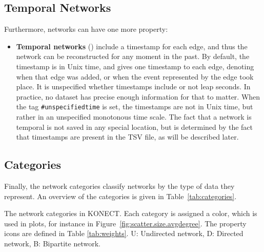 \documentclass{article}
\begin{document}
\subsection{Temporal Networks}
Furthermore, networks can have one more property: 
\begin{itemize}
\item \textbf{Temporal networks} (\Clocklogo) include a timestamp for each
  edge, and thus the network can be reconstructed for any moment in the
  past.  By default, the timestamp is in Unix time, and gives one
  timestamp to each edge, denoting when that edge was added, or when the
  event represented by the edge took place.  
  It is unspecified whether timestamps include or not leap seconds.  In
  practice, no dataset has precise enough information for that to matter.
  When the tag \texttt{\#unspecifiedtime} is set, the timestamps are not in Unix
  time, but rather in an unspecified monotonous time scale. 
  The fact that a network is temporal is not saved in any special
  location, but is determined by the fact that timestamps are present in
  the TSV file, as will be described later. 
\end{itemize}

\subsection{Categories}
Finally, the network categories classify networks by the type of data they
represent.  
An overview of the categories is given in Table~\ref{tab:categories}. 

\begin{table}
  \caption{
    The network categories in KONECT.  
    Each category is assigned a color, which is used in plots, for
    instance in Figure~\ref{fig:scatter.size.avgdegree}. The property
    icons are defined in Table \ref{tab:weights}.  U: Undirected
    network, D: Directed network, B: Bipartite network. 
    \label{tab:categories}
  }
  \centering
  \makebox[\textwidth]{
    
  }
\end{table}
\end{document}
